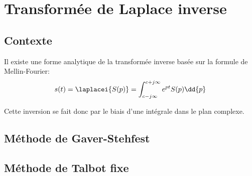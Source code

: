 \chapter{Transformée de Laplace inverse~\label{annexe-invL}}

\section{Contexte}

Il existe une forme analytique de la transformée inverse basée sur                                                            
la formule de Mellin-Fourier\cite{Ostertag}:                                                                                  
$$                                                                                                                            
s(t)=\laplacei{S(p)}=\int_{c-j\infty}^{c+j\infty} e^{pt}S(p)\dd{p}                                                            
$$    

Cette inversion se fait donc par le biais d'une intégrale dans le plan 
complexe.


\section{Méthode de Gaver-Stehfest}

\section{Méthode de Talbot fixe}
